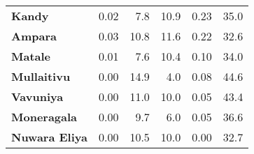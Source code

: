 \begin{tabular}{lrrrrr}
\textbf{Kandy       } &        0.02 &         7.8 &         10.9 &             0.23 &        35.0 \\
\textbf{Ampara      } &        0.03 &        10.8 &         11.6 &             0.22 &        32.6 \\
\textbf{Matale      } &        0.01 &         7.6 &         10.4 &             0.10 &        34.0 \\
\textbf{Mullaitivu  } &        0.00 &        14.9 &          4.0 &             0.08 &        44.6 \\
\textbf{Vavuniya    } &        0.00 &        11.0 &         10.0 &             0.05 &        43.4 \\
\textbf{Moneragala  } &        0.00 &         9.7 &          6.0 &             0.05 &        36.6 \\
\textbf{Nuwara Eliya} &        0.00 &        10.5 &         10.0 &             0.00 &        32.7 \\
\bottomrule
\end{tabular}
